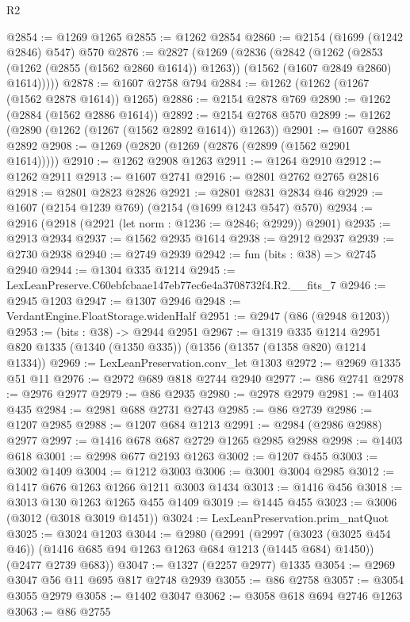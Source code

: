 \begin{lexlean}{R2}
\begin{coremodule}
@2854 := @1269 @1265
@2855 := @1262 @2854
@2860 := @2154 (@1699 (@1242 @2846) @547) @570
@2876 := @2827
    (@1269
      (@2836
        (@2842
          (@1262
            (@2853 (@1262 (@2855 (@1562 @2860 @1614)) @1263))
            (@1562 (@1607 @2849 @2860) @1614)))))
@2878 := @1607 @2758 @794
@2884 := @1262 (@1262 (@1267 (@1562 @2878 @1614)) @1265)
@2886 := @2154 @2878 @769
@2890 := @1262 (@2884 (@1562 @2886 @1614))
@2892 := @2154 @2768 @570
@2899 := @1262 (@2890 (@1262 (@1267 (@1562 @2892 @1614)) @1263))
@2901 := @1607 @2886 @2892
@2908 := @1269 (@2820 (@1269 (@2876 (@2899 (@1562 @2901 @1614)))))
@2910 := @1262 @2908 @1263
@2911 := @1264 @2910
@2912 := @1262 @2911
@2913 := @1607 @2741
@2916 := @2801 @2762 @2765 @2816
@2918 := @2801 @2823 @2826
@2921 := @2801 @2831 @2834 @46
@2929 := @1607 (@2154 @1239 @769) (@2154 (@1699 @1243 @547) @570)
@2934 := @2916 (@2918 (@2921 (let norm : @1236 := @2846; @2929)) @2901)
@2935 := @2913 @2934
@2937 := @1562 @2935 @1614
@2938 := @2912 @2937
@2939 := @2730 @2938
@2940 := @2749 @2939
@2942 := fun (bits : @38) => @2745 @2940
@2944 := @1304 @335 @1214
@2945 := LexLeanPreserve.C60ebfcbaae147eb77ec6e4a3708732f4.R2.__fits_7
@2946 := @2945 @1203
@2947 := @1307 @2946
@2948 := VerdantEngine.FloatStorage.widenHalf
@2951 := @2947 (@86 (@2948 @1203))
@2953 := (bits : @38) -> @2944 @2951
@2967 := @1319
    @335
    @1214
    @2951
    @820
    @1335
    (@1340 (@1350 @335))
    (@1356 (@1357 (@1358 @820) @1214 @1334))
@2969 := LexLeanPreservation.conv_let @1303
@2972 := @2969 @1335 @51 @11
@2976 := @2972 @689 @818 @2744 @2940
@2977 := @86 @2741
@2978 := @2976 @2977
@2979 := @86 @2935
@2980 := @2978 @2979
@2981 := @1403 @435
@2984 := @2981 @688 @2731 @2743
@2985 := @86 @2739
@2986 := @1207 @2985
@2988 := @1207 @684 @1213
@2991 := @2984 (@2986 @2988) @2977
@2997 := @1416 @678 @687 @2729 @1265 @2985 @2988
@2998 := @1403 @618
@3001 := @2998 @677 @2193 @1263
@3002 := @1207 @455
@3003 := @3002 @1409
@3004 := @1212 @3003
@3006 := @3001 @3004 @2985
@3012 := @1417 @676 @1263 @1266 @1211 @3003 @1434
@3013 := @1416 @456
@3018 := @3013 @130 @1263 @1265 @455 @1409
@3019 := @1445 @455
@3023 := @3006 (@3012 (@3018 @3019 @1451))
@3024 := LexLeanPreservation.prim_natQuot
@3025 := @3024 @1203
@3044 := @2980
    (@2991
      (@2997 (@3023 (@3025 @454 @46)) (@1416 @685 @94 @1263 @1263 @684 @1213 (@1445 @684) @1450))
      (@2477 @2739 @683))
@3047 := @1327 (@2257 @2977) @1335
@3054 := @2969 @3047 @56 @11 @695 @817 @2748 @2939
@3055 := @86 @2758
@3057 := @3054 @3055 @2979
@3058 := @1402 @3047
@3062 := @3058 @618 @694 @2746 @1263
@3063 := @86 @2755

\end{coremodule}
\end{lexlean}
